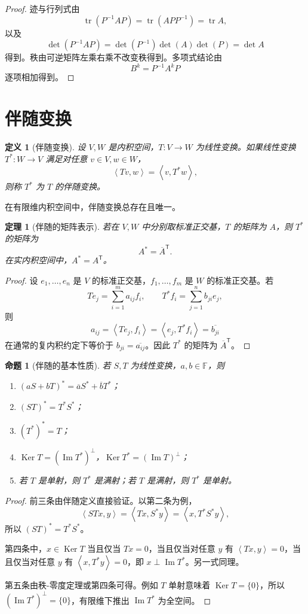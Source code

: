 \documentclass[UTF8,openany,zihao=-4]{ctexbook}
\theoremstyle{cnplain}
\newtheorem{definition}{定义}[chapter]
\newtheorem{theorem}{定理}[chapter]
\newtheorem{proposition}{命题}[chapter]
\newcommand{\F}{\mathbb F}
\newcommand{\Ker}{\operatorname{Ker}}
\newcommand{\Img}{\operatorname{Im}}
\newcommand{\tr}{\operatorname{tr}}
\newcommand{\inner}[2]{\left\langle #1,#2\right\rangle}
\begin{document}
\begin{proof}
迹与行列式由
\[
\tr(P^{-1}AP)=\tr(APP^{-1})=\tr A,
\]
以及
\[
\det(P^{-1}AP)=\det(P^{-1})\det(A)\det(P)=\det A
\]
得到。秩由可逆矩阵左乘右乘不改变秩得到。多项式结论由
\[
B^k=P^{-1}A^kP
\]
逐项相加得到。
\end{proof}

\section{伴随变换}

\begin{definition}[伴随变换]
设 $V,W$ 是内积空间，$T:V\to W$ 为线性变换。如果线性变换 $T^*:W\to V$ 满足对任意 $v\in V,w\in W$，
\[
\inner{Tv}{w}=\inner{v}{T^*w},
\]
则称 $T^*$ 为 $T$ 的伴随变换。
\end{definition}

在有限维内积空间中，伴随变换总存在且唯一。

\begin{theorem}[伴随的矩阵表示]
若在 $V,W$ 中分别取标准正交基，$T$ 的矩阵为 $A$，则 $T^*$ 的矩阵为
\[
A^*=\overline{A}^{\mathsf T}.
\]
在实内积空间中，$A^*=A^{\mathsf T}$。
\end{theorem}

\begin{proof}
设 $e_1,
\ldots,e_n$ 是 $V$ 的标准正交基，$f_1,
\ldots,f_m$ 是 $W$ 的标准正交基。若
\[
Te_j=\sum_{i=1}^m a_{ij}f_i,
\qquad
T^*f_i=\sum_{j=1}^n b_{ji}e_j,
\]
则
\[
a_{ij}=\inner{Te_j}{f_i}=\inner{e_j}{T^*f_i}=\overline{b_{ji}}
\]
在通常的复内积约定下等价于 $b_{ji}=\overline{a_{ij}}$。因此 $T^*$ 的矩阵为 $\overline{A}^{\mathsf T}$。
\end{proof}

\begin{proposition}[伴随的基本性质]
若 $S,T$ 为线性变换，$a,b\in\F$，则
\begin{enumerate}
  \item $(aS+bT)^*=\overline a S^*+\overline b T^*$；
  \item $(ST)^*=T^*S^*$；
  \item $(T^*)^*=T$；
  \item $\Ker T=(\Img T^*)^\perp$，$\Ker T^*=(\Img T)^\perp$；
  \item 若 $T$ 是单射，则 $T^*$ 是满射；若 $T$ 是满射，则 $T^*$ 是单射。
\end{enumerate}
\end{proposition}

\begin{proof}
前三条由伴随定义直接验证。以第二条为例，
\[
\inner{STx}{y}=\inner{Tx}{S^*y}=\inner{x}{T^*S^*y},
\]
所以 $(ST)^*=T^*S^*$。

第四条中，$x\in\Ker T$ 当且仅当 $Tx=0$，当且仅当对任意 $y$ 有 $\inner{Tx}{y}=0$，当且仅当对任意 $y$ 有 $\inner{x}{T^*y}=0$，即 $x\perp\Img T^*$。另一式同理。

第五条由秩-零度定理或第四条可得。例如 $T$ 单射意味着 $\Ker T=\{0\}$，所以 $(\Img T^*)^\perp=\{0\}$，有限维下推出 $\Img T^*$ 为全空间。
\end{proof}
\end{document}
